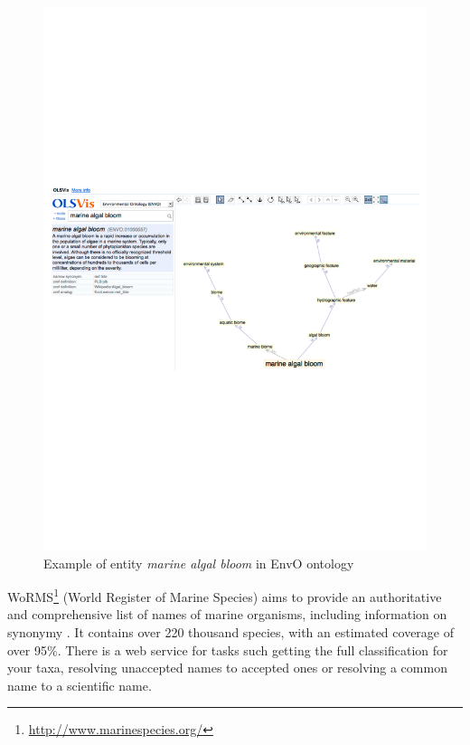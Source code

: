 \begin{figure}
\begin{center}
\includegraphics[scale=0.6]{figures/envo-example.pdf}
 \caption{Example of entity \emph{marine algal bloom} in EnvO ontology}
\label{fig:envo-example}
\end{center}
\end{figure}


WoRMS\footnote{\url{http://www.marinespecies.org/}}  (World Register of Marine Species) aims to provide an authoritative and comprehensive list of names of marine organisms, including information on synonymy \citep{Costello2013Global}.
It contains over 220 thousand species, with an estimated coverage of over 95\%.
There is a web service for tasks such getting the full classification for your taxa, resolving unaccepted names to accepted ones or resolving a common name to a scientific name.

